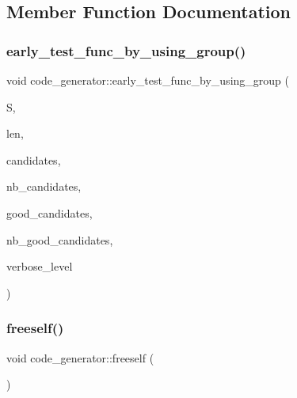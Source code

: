 \subsection{Member Function Documentation}
\mbox{\label{classcode__generator_a96a6170f5b9a905203ae4d8717750854}} 
\subsubsection{\texorpdfstring{early\+\_\+test\+\_\+func\+\_\+by\+\_\+using\+\_\+group()}{early\_test\_func\_by\_using\_group()}}
{\footnotesize\ttfamily void code\+\_\+generator\+::early\+\_\+test\+\_\+func\+\_\+by\+\_\+using\+\_\+group (\begin{DoxyParamCaption}\item[{\mbox{\hyperlink{galois_8h_a09fddde158a3a20bd2dcadb609de11dc}{I\+NT}} $\ast$}]{S,  }\item[{\mbox{\hyperlink{galois_8h_a09fddde158a3a20bd2dcadb609de11dc}{I\+NT}}}]{len,  }\item[{\mbox{\hyperlink{galois_8h_a09fddde158a3a20bd2dcadb609de11dc}{I\+NT}} $\ast$}]{candidates,  }\item[{\mbox{\hyperlink{galois_8h_a09fddde158a3a20bd2dcadb609de11dc}{I\+NT}}}]{nb\+\_\+candidates,  }\item[{\mbox{\hyperlink{galois_8h_a09fddde158a3a20bd2dcadb609de11dc}{I\+NT}} $\ast$}]{good\+\_\+candidates,  }\item[{\mbox{\hyperlink{galois_8h_a09fddde158a3a20bd2dcadb609de11dc}{I\+NT}} \&}]{nb\+\_\+good\+\_\+candidates,  }\item[{\mbox{\hyperlink{galois_8h_a09fddde158a3a20bd2dcadb609de11dc}{I\+NT}}}]{verbose\+\_\+level }\end{DoxyParamCaption})}

\mbox{\label{classcode__generator_a5493e5a36f07edb6e59a411d1a0770a7}} 
\subsubsection{\texorpdfstring{freeself()}{freeself()}}
{\footnotesize\ttfamily void code\+\_\+generator\+::freeself (\begin{DoxyParamCaption}{ }\end{DoxyParamCaption})}

